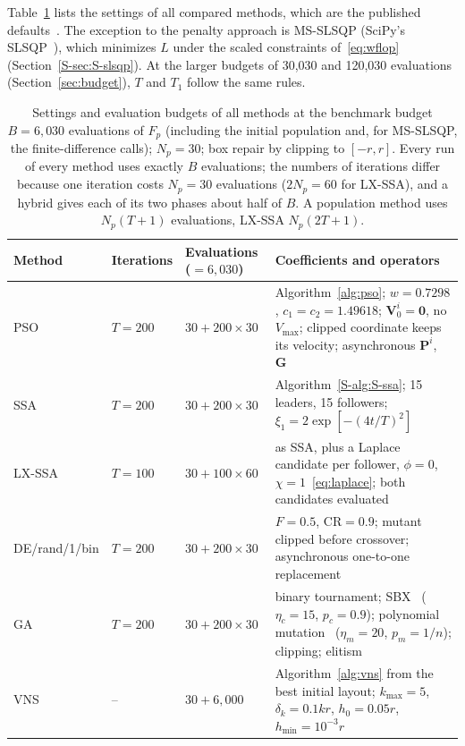Table~\ref{tab:params} lists the settings of all compared methods, which are the published defaults~\cite{Clerc2002,Mirjalili2017,Solanki2023,Storn1997,Mladenovic2008}. The exception to the penalty approach is MS-SLSQP (SciPy's SLSQP~\cite{Kraft1988}), which minimizes $L$ under the scaled constraints of~\eqref{eq:wflop} (Section~\ref{S-sec:S-slsqp}). At the larger budgets of 30,030 and 120,030 evaluations (Section~\ref{sec:budget}), $T$ and $T_1$ follow the same rules.
\begin{table}[!t]
\centering
\caption{Settings and evaluation budgets of all methods at the benchmark budget $B=6{,}030$ evaluations of $F_p$ (including the initial population and, for MS-SLSQP, the finite-difference calls); $N_p=30$; box repair by clipping to $[-r,r]$. Every run of every method uses exactly $B$ evaluations; the numbers of iterations differ because one iteration costs $N_p=30$ evaluations ($2N_p=60$ for LX-SSA), and a hybrid gives each of its two phases about half of $B$. A population method uses $N_p(T+1)$ evaluations, LX-SSA $N_p(2T+1)$.}
\label{tab:params}
\scriptsize\setlength{\tabcolsep}{3.5pt}
\begin{tabular}{@{}>{\raggedright\arraybackslash}p{}>{\raggedright\arraybackslash}p{}>{\raggedright\arraybackslash}p{}>{\raggedright\arraybackslash}p{}@{}}
\toprule
Method & Iterations & Evaluations ($=6{,}030$) & Coefficients and operators \\
\midrule
PSO & $T=200$ & $30+200\times30$ & Algorithm~\ref{alg:pso}; $w=0.7298$, $c_1=c_2=1.49618$; $\mathbf V^i_0=\mathbf 0$, no $V_{\max}$; clipped coordinate keeps its velocity; asynchronous $\mathbf P^i$, $\mathbf G$ \\
SSA & $T=200$ & $30+200\times30$ & Algorithm~\ref{S-alg:S-ssa}; 15 leaders, 15 followers; $\xi_1=2\exp[-(4t/T)^2]$ \\
LX-SSA & $T=100$ & $30+100\times60$ & as SSA, plus a Laplace candidate per follower, $\phi=0$, $\chi=1$~\eqref{eq:laplace}; both candidates evaluated \\
DE/rand/1/bin & $T=200$ & $30+200\times30$ & $F=0.5$, $\mathrm{CR}=0.9$; mutant clipped before crossover; asynchronous one-to-one replacement \\
GA & $T=200$ & $30+200\times30$ & binary tournament; SBX~\cite{Deb1995} ($\eta_c=15$, $p_c=0.9$); polynomial mutation~\cite{DebGoyal1996} ($\eta_m=20$, $p_m=1/n$); clipping; elitism \\
VNS & -- & $30+6{,}000$ & Algorithm~\ref{alg:vns} from the best initial layout; $k_{\max}=5$, $\delta_k=0.1kr$, $h_0=0.05r$, $h_{\min}=10^{-3}r$ \\

\end{tabular}
\end{table}
